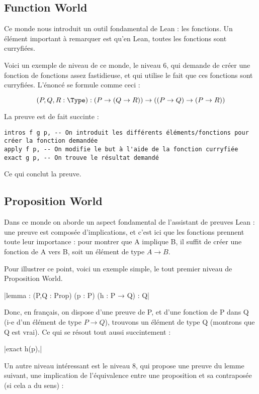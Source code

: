 
\subsection{Function World}
Ce monde nous introduit un outil fondamental de Lean : les fonctions. 
Un élément important à remarquer est qu'en Lean, toutes les fonctions sont curryfiées.

Voici un exemple de niveau de ce monde, le niveau 6, qui demande de créer une fonction de fonctions assez fastidieuse, et qui utilise le fait que ces fonctions sont curryfiées. 
L'énoncé se formule comme ceci : 

\begin{equation*}
        (P, Q, R : \Type) : (P \to (Q \to R)) \to ((P \to Q) \to (P \to R))
\end{equation*}

La preuve est de fait succinte : 
\begin{verbatim}
intros f g p, -- On introduit les différents éléments/fonctions pour créer la fonction demandée 
apply f p, -- On modifie le but à l'aide de la fonction curryfiée 
exact g p, -- On trouve le résultat demandé 
\end{verbatim}
Ce qui conclut la preuve.

\subsection{Proposition World}
Dans ce monde on aborde un aspect fondamental de l'assistant de preuves Lean : une preuve est composée d'implications, et c'est ici que les fonctions prennent toute leur importance : pour montrer que A implique B, il suffit de créer une fonction de A vers B, soit un élément de type $A \to B$.

Pour illustrer ce point, voici un exemple simple, le tout premier niveau de Proposition World. 

|lemma : (P,Q : Prop) (p : P) (h : P → Q) : Q|

Donc, en français, on dispose d'une preuve de P, et d'une fonction de P dans Q (i-e d'un élément de type $P \to Q$), trouvons un élément de type Q (montrons que Q est vrai). 
Ce qui se résout tout aussi succintement : 

|exact h(p),| 

Un autre niveau intéressant est le niveau 8, qui propose une preuve du lemme suivant, une implication de l'équivalence entre une proposition et sa contraposée (si cela a du sens) : 

